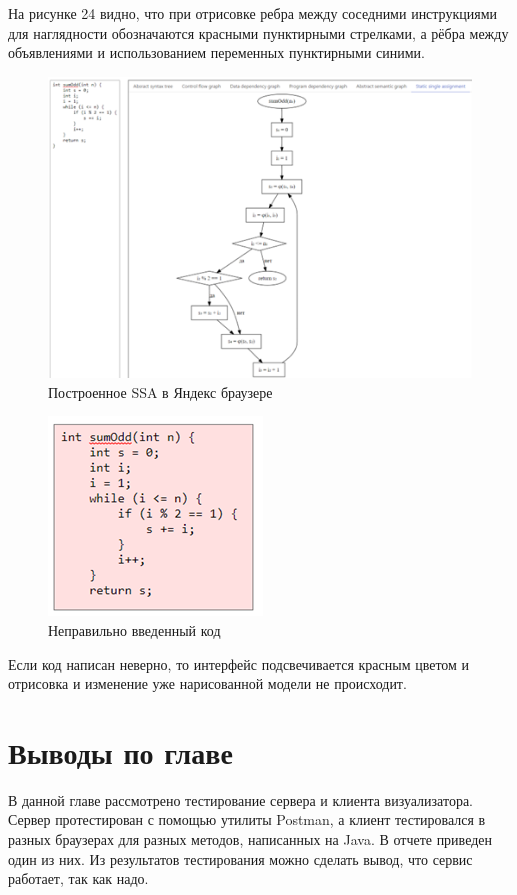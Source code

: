 На рисунке 24 видно, что при отрисовке ребра между соседними инструкциями для наглядности обозначаются красными пунктирными стрелками, а рёбра между объявлениями и использованием переменных пунктирными синими.
\begin{figure}[ht!] 
	\center
	\includegraphics [scale=0.27] {my_folder/images/my/26}
	\caption{Построенное SSA в Яндекс браузере} 
	\label{fig:26}  
\end{figure}
\begin{figure}[ht!] 
	\center
	\includegraphics [scale=0.27] {my_folder/images/my/27}
	\caption{Неправильно введенный код} 
	\label{fig:27}  
\end{figure}
Если код написан неверно, то интерфейс подсвечивается красным цветом и отрисовка и изменение уже нарисованной модели не происходит.
\section{Выводы по главе} \label{ch6:sec3}
В данной главе рассмотрено тестирование сервера и клиента визуализатора. Сервер протестирован с помощью утилиты Postman, а клиент тестировался в разных браузерах для разных методов, написанных на Java. В отчете приведен один из них. Из результатов тестирования можно сделать вывод, что сервис работает, так как надо.
\newpage